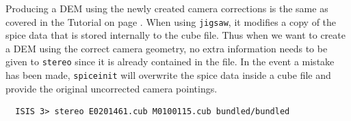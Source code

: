 Producing a DEM using the newly created camera corrections is the same
as covered in the Tutorial on page \pageref{ch:tutorial}. When using
\texttt{jigsaw}, it modifies a copy of the spice data that is stored
internally to the cube file. Thus when we want to create a DEM using
the correct camera geometry, no extra information needs to be given to
\texttt{stereo} since it is already contained in the file. In the
event a mistake has been made, \texttt{spiceinit} will overwrite the
spice data inside a cube file and provide the original uncorrected
camera pointings.

\begin{verbatim}
  ISIS 3> stereo E0201461.cub M0100115.cub bundled/bundled
\end{verbatim}





